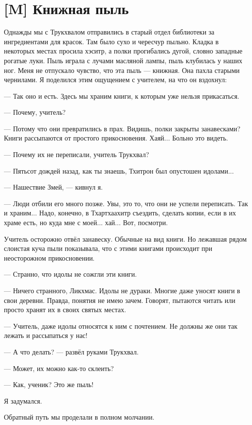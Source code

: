 \section{[M] Книжная пыль}

Однажды мы с Трукхвалом отправились в старый отдел библиотеки за ингредиентами для красок.
Там было сухо и чересчур пыльно.
Кладка в некоторых местах просила хэситр, а полки прогибались дугой, словно западные рогатые луки.
Пыль играла с лучами масляной лампы, пыль клубилась у наших ног.
Меня не отпускало чувство, что эта пыль --- книжная.
Она пахла старыми чернилами.
Я поделился этим ощущением с учителем, на что он вздохнул:

--- Так оно и есть.
Здесь мы храним книги, к которым уже нельзя прикасаться.

--- Почему, учитель?

--- Потому что они превратились в прах.
Видишь, полки закрыты занавесками?
Книги рассыпаются от простого прикосновения.
Хаяй...
Больно это видеть.

--- Почему их не переписали, учитель Трукхвал?

--- Пятьсот дождей назад, как ты знаешь, Тхитрон был опустошен идолами...

--- Нашествие Змей, --- кивнул я.

--- Люди отбили его много позже.
Увы, это то, что они не успели переписать.
Так и храним...
Надо, конечно, в Тхартхаахитр съездить, сделать копии, если в их храме есть, но куда мне с моей... хай...
Вот, посмотри.

Учитель осторожно отвёл занавеску.
Обычные на вид книги.
Но лежавшая рядом слоистая куча пыли показывала, что с этими книгами происходит при неосторожном прикосновении.

--- Странно, что идолы не сожгли эти книги.

--- Ничего странного, Ликхмас.
Идолы не дураки.
Многие даже уносят книги в свои деревни.
Правда, понятия не имею зачем.
Говорят, пытаются читать или просто хранят их в своих святых местах.

--- Учитель, даже идолы относятся к ним с почтением.
Не должны же они так лежать и рассыпаться у нас!

--- А что делать? --- развёл руками Трукхвал.

--- Может, их можно как-то склеить?

--- Как, ученик?
Это же пыль!

Я задумался.

Обратный путь мы проделали в полном молчании.

